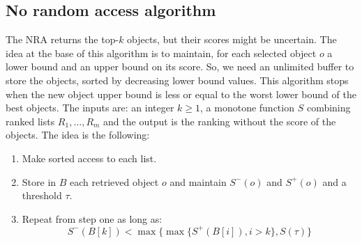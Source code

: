 \documentclass[12pt, a4paper]{report}
\begin{document}
    \subsection{No random access algorithm}
    The NRA returns the top-$k$ objects, but their scores might be uncertain. The idea at the base of this algorithm is to maintain, for each selected object
    $o$ a lower bound and an upper bound on its score. So, we need an unlimited buffer to 
    store the objects, sorted by decreasing lower bound values. This algorithm 
    stops when the new object upper bound is less or equal to the worst lower bound of the best objects. The inputs are: 
    an integer $k \geq 1$, a monotone function $S$ combining ranked lists $R_1, \dots, R_m$ and the output is the ranking
    without the score of the objects. The idea is the following: 
    \begin{enumerate}
        \item Make sorted access to each list. 
        \item Store in $B$ each retrieved object $o$ and maintain $S^{-}(o)$ and $S^{+}(o)$ and a threshold $\tau$. 
        \item Repeat from step one as long as:
            \[S^{-}(B[k]) < \max\{ \max\{S^{+}(B[i]), i > k\}, S(\tau) \}\]
    \end{enumerate}
\end{document}
